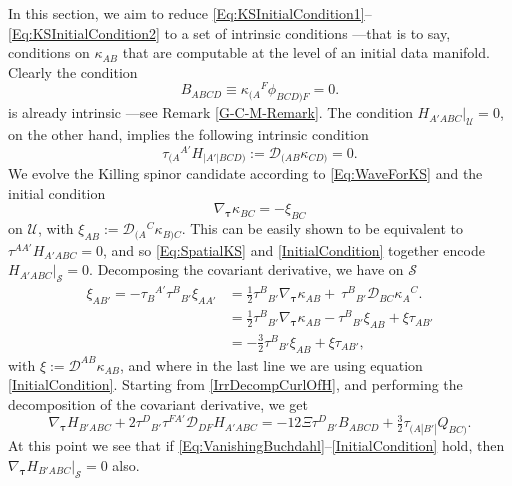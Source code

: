 \documentclass[10pt,a4paper]{article}
\theoremstyle{plain}
\begin{document}
In this section, we aim to reduce \eqref{Eq:KSInitialCondition1}--\eqref{Eq:KSInitialCondition2} to a set of intrinsic conditions ---that is to say, conditions on $\kappa_{AB}$ that are computable at the level of an initial data manifold. Clearly the condition 
\begin{equation}
B_{ABCD}\equiv \kappa_{(A}{}^F\phi_{BCD)F}=0. \label{Eq:VanishingBuchdahl}
\end{equation}
is already intrinsic ---see Remark \ref{G-C-M-Remark}. 
The condition $H_{A'ABC}\big\vert_{\mathcal{U}}=0$, on the other hand, implies the following intrinsic condition
\begin{equation}
 \tau_{(A}{}^{A'}H_{\vert A'\vert BCD)} :=  \mathcal{D}_{(AB}\kappa_{CD)}=0. \label{Eq:SpatialKS}
\end{equation}
We evolve the Killing spinor candidate according to \eqref{Eq:WaveForKS} and the initial condition
\begin{equation}
     \nabla_{\bm\tau} \kappa_{BC} = - \xi_{BC}\label{InitialCondition}
\end{equation}
on $\mathcal{U}$, with $\xi_{AB}:=\mathcal{D}_{(A}{}^C\kappa_{B)C}$. This can be easily shown to be equivalent to $\tau^{AA'}H_{A'ABC}=0$, and so \eqref{Eq:SpatialKS} and \eqref{InitialCondition} together encode $H_{A'ABC}\big\vert_{\mathcal{S}}=0$. Decomposing the covariant derivative, we have on $\mathcal{S}$
\begin{align}
\xi_{AB'} = - \tau_{B}{}^{A'} \tau^{B}{}_{B'}\xi_{AA'}
&=\tfrac{1}{2}\tau^{B}{}_{B'}\nabla_{\bm\tau}\kappa_{AB} +
\ \tau^{B}{}_{B'}
\mathcal{D}_{BC}\kappa_{A}{}^{C}. \nonumber\\ &=\tfrac{1}{2}\tau^{B}{}_{B'}\nabla_{\bm\tau}\kappa_{AB}
- \tau^B{}_{B'}\xi_{AB} + \xi\tau_{AB'} \nonumber\\ &= -\tfrac{3}{2}
\tau^B{}_{B'}\xi_{AB} +
\xi\tau_{AB'} \label{DecompXiOnSUsingInitialCondition},
\end{align}
with $\xi:=\mathcal{D}^{AB}\kappa_{AB}$, and where in the last line we
are using equation \eqref{InitialCondition}. Starting from
\eqref{IrrDecompCurlOfH}, and performing the decomposition of the
covariant derivative, we get
\[ \nabla_{\bm\tau} H_{B'ABC} + 2 \tau^{D}{}_{B'} \tau^{FA'} \mathcal{D}_{DF}H_{A'ABC} = -12 \Xi \tau^{D}{}_{B'}B_{ABCD} + \tfrac{3}{2} \tau_{(A|B'|}Q_{BC)}.\]
At this point we see that if
\eqref{Eq:VanishingBuchdahl}--\eqref{InitialCondition} hold, then
$\nabla_{\bm\tau} H_{B'ABC}\big\vert_{\mathcal{S}}=0$ also.
\end{document}
